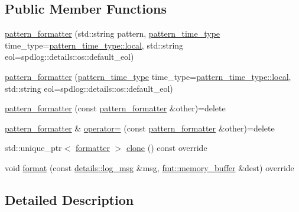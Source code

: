 \subsection*{Public Member Functions}
\begin{DoxyCompactItemize}
\item 
\hyperlink{classspdlog_1_1pattern__formatter_a77d5f83cf0e00029d5796b81de1e1a9e}{pattern\+\_\+formatter} (std\+::string pattern, \hyperlink{namespacespdlog_ad598fbd8338772e66ae09e8723a07ced}{pattern\+\_\+time\+\_\+type} time\+\_\+type=\hyperlink{namespacespdlog_ad598fbd8338772e66ae09e8723a07cedaf5ddaf0ca7929578b408c909429f68f2}{pattern\+\_\+time\+\_\+type\+::local}, std\+::string eol=spdlog\+::details\+::os\+::default\+\_\+eol)
\item 
\hyperlink{classspdlog_1_1pattern__formatter_a4c11f41c2e6a62ac10e80170c0958192}{pattern\+\_\+formatter} (\hyperlink{namespacespdlog_ad598fbd8338772e66ae09e8723a07ced}{pattern\+\_\+time\+\_\+type} time\+\_\+type=\hyperlink{namespacespdlog_ad598fbd8338772e66ae09e8723a07cedaf5ddaf0ca7929578b408c909429f68f2}{pattern\+\_\+time\+\_\+type\+::local}, std\+::string eol=spdlog\+::details\+::os\+::default\+\_\+eol)
\item 
\hyperlink{classspdlog_1_1pattern__formatter_a3c7051314c9422b667e254cb27d81b80}{pattern\+\_\+formatter} (const \hyperlink{classspdlog_1_1pattern__formatter}{pattern\+\_\+formatter} \&other)=delete
\item 
\hyperlink{classspdlog_1_1pattern__formatter}{pattern\+\_\+formatter} \& \hyperlink{classspdlog_1_1pattern__formatter_a868ba15a181c7a407780aaa84902de31}{operator=} (const \hyperlink{classspdlog_1_1pattern__formatter}{pattern\+\_\+formatter} \&other)=delete
\item 
std\+::unique\+\_\+ptr$<$ \hyperlink{classspdlog_1_1formatter}{formatter} $>$ \hyperlink{classspdlog_1_1pattern__formatter_a73a60f53c23e860a2c1229c0781819f9}{clone} () const override
\item 
void \hyperlink{classspdlog_1_1pattern__formatter_ae43e84d7421ee7810b22ce1dc817ca3f}{format} (const \hyperlink{structspdlog_1_1details_1_1log__msg}{details\+::log\+\_\+msg} \&msg, \hyperlink{format_8h_a21cbf729f69302f578e6db21c5e9e0d2}{fmt\+::memory\+\_\+buffer} \&dest) override
\end{DoxyCompactItemize}


\subsection{Detailed Description}


